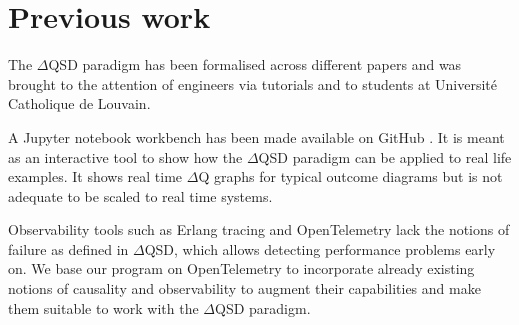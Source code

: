 \section{Previous work}
    The $\Delta$QSD paradigm has been formalised across different papers \cite{myo} \cite{art} and was brought to the attention of engineers via tutorials \cite{dq-tut} and to students at Université Catholique de Louvain. \cite{dq-ucl} 
    
    A Jupyter notebook workbench has been made available on GitHub \cite{dqsd-wkb}. It is meant as an interactive tool to show how the $\Delta$QSD paradigm can be applied to real life examples. It shows real time $\Delta$Q graphs for typical outcome diagrams but is not adequate to be scaled to real time systems.
    
    Observability tools such as Erlang tracing \cite{erl-t} and OpenTelemetry \cite{otel-e} lack the notions of failure as defined in $\Delta$QSD, which allows detecting performance problems early on. We base our program on OpenTelemetry to incorporate already existing notions of causality and observability to augment their capabilities and make them suitable to work with the $\Delta$QSD paradigm.
